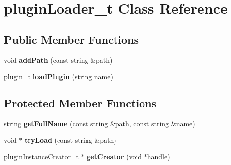 \hypertarget{classpluginLoader__t}{\section{plugin\-Loader\-\_\-t \-Class \-Reference}
\label{classpluginLoader__t}
}
\subsection*{\-Public \-Member \-Functions}
\begin{DoxyCompactItemize}
\item 
\hypertarget{classpluginLoader__t_ab49a6a26c13171af03713151627cda53}{void {\bfseries add\-Path} (const string \&path)}\label{classpluginLoader__t_ab49a6a26c13171af03713151627cda53}

\item 
\hypertarget{classpluginLoader__t_a17b9a0e4889f6593134b0da32ed8b21d}{\hyperlink{classplugin__t}{plugin\-\_\-t} {\bfseries load\-Plugin} (string name)}\label{classpluginLoader__t_a17b9a0e4889f6593134b0da32ed8b21d}

\end{DoxyCompactItemize}
\subsection*{\-Protected \-Member \-Functions}
\begin{DoxyCompactItemize}
\item 
\hypertarget{classpluginLoader__t_acf4ffdcabf1d653867924b12e3a2e62f}{string {\bfseries get\-Full\-Name} (const string \&path, const string \&name)}\label{classpluginLoader__t_acf4ffdcabf1d653867924b12e3a2e62f}

\item 
\hypertarget{classpluginLoader__t_a76108e59349ecb3a82fe736245e56204}{void $\ast$ {\bfseries try\-Load} (const string \&path)}\label{classpluginLoader__t_a76108e59349ecb3a82fe736245e56204}

\item 
\hypertarget{classpluginLoader__t_a329c6daa7af2d4916fe4eb19074c984c}{\hyperlink{classpluginInstanceCreator__t}{plugin\-Instance\-Creator\-\_\-t} $\ast$ {\bfseries get\-Creator} (void $\ast$handle)}\label{classpluginLoader__t_a329c6daa7af2d4916fe4eb19074c984c}

\end{DoxyCompactItemize}
